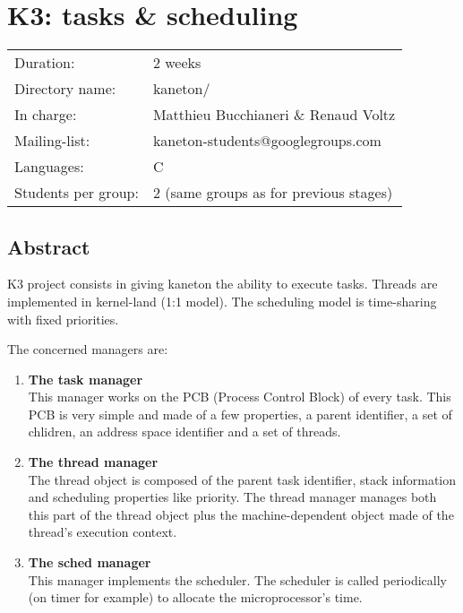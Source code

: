 
%
%

\chapter{K3: tasks \& scheduling}

%
%

\begin{tabular}{p{7cm}l}
Duration: & 2 weeks \\
Directory name: & kaneton/ \\
In charge: & Matthieu Bucchianeri \& Renaud Voltz\\
Mailing-list: & kaneton-students@googlegroups.com \\
Languages: & C \\
Students per group: & 2 (same groups as for previous stages) \\
\end{tabular}

\section{Abstract}

K3 project consists in giving kaneton the ability to execute
tasks. Threads are implemented in kernel-land (1:1 model). The
scheduling model is time-sharing with fixed priorities.

The concerned managers are:

\begin{enumerate}
  \item
    {\bf The task manager}\\
    This manager works on the PCB (Process Control Block) of every
    task. This PCB is very simple and made of a few properties, a
    parent identifier, a set of chlidren, an address space identifier
    and a set of threads.
  \item
    {\bf The thread manager}\\
    The thread object is composed of the parent task identifier, stack
    information and scheduling properties like priority. The thread
    manager manages both this part of the thread object plus the
    machine-dependent object made of the thread's execution context.
  \item
    {\bf The sched manager}\\ This manager implements the
    scheduler. The scheduler is called periodically (on timer for
    example) to allocate the microprocessor's time.
\end{enumerate}

